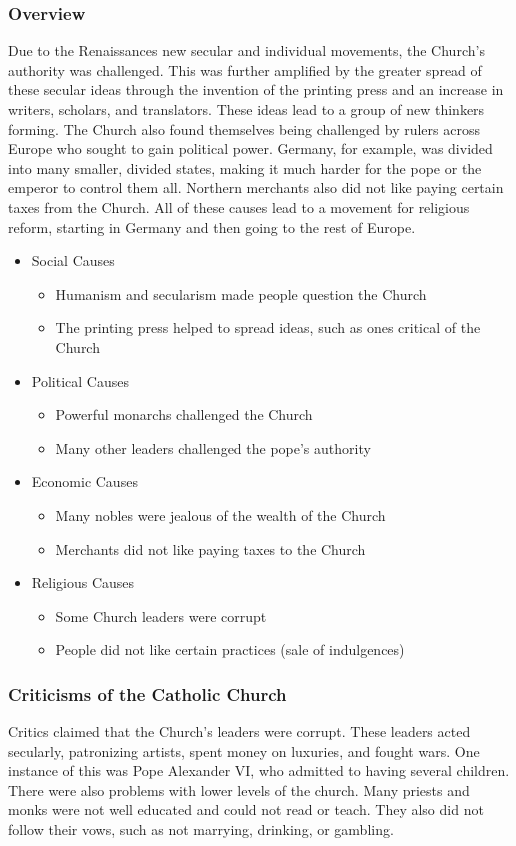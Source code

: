 \documentclass[11pt]{article}
\begin{document}
\subsubsection{Overview}
\label{sec:org5d75a9d}
Due to the Renaissances new secular and individual movements, the Church's authority was challenged. This was further amplified by the greater spread of these secular ideas through the invention of the printing press and an increase in writers, scholars, and translators. These ideas lead to a group of new thinkers forming. The Church also found themselves being challenged by rulers across Europe who sought to gain political power. Germany, for example, was divided into many smaller, divided states, making it much harder for the pope or the emperor to control them all. Northern merchants also did not like paying certain taxes from the Church. All of these causes lead to a movement for religious reform, starting in Germany and then going to the rest of Europe.
\begin{itemize}
\item Social Causes
\begin{itemize}
\item Humanism and secularism made people question the Church
\item The printing press helped to spread ideas, such as ones critical of the Church
\end{itemize}
\item Political Causes
\begin{itemize}
\item Powerful monarchs challenged the Church
\item Many other leaders challenged the pope's authority
\end{itemize}
\item Economic Causes
\begin{itemize}
\item Many nobles were jealous of the wealth of the Church
\item Merchants did not like paying taxes to the Church
\end{itemize}
\item Religious Causes
\begin{itemize}
\item Some Church leaders were corrupt
\item People did not like certain practices (sale of indulgences)
\end{itemize}
\end{itemize}
\subsubsection{Criticisms of the Catholic Church}
\label{sec:orgcf7653f}
Critics claimed that the Church's leaders were corrupt. These leaders acted secularly, patronizing artists, spent money on luxuries, and fought wars. One instance of this was Pope Alexander VI, who admitted to having several children. There were also problems with lower levels of the church. Many priests and monks were not well educated and could not read or teach. They also did not follow their vows, such as not marrying, drinking, or gambling.
\end{document}
